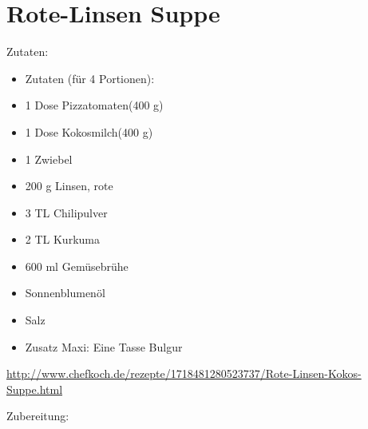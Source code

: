 \section{Rote-Linsen Suppe}
Zutaten:
\begin{itemize}
	\item Zutaten (für 4 Portionen):
	\item 1 Dose	Pizzatomaten(400 g)
	\item 1 Dose	Kokosmilch(400 g)
	\item 1 	Zwiebel
	\item 200 g	Linsen, rote
	\item 3 TL	Chilipulver
	\item 2 TL	Kurkuma
	\item 600 ml	Gemüsebrühe
	\item Sonnenblumenöl
	\item Salz
	\item Zusatz Maxi: Eine Tasse Bulgur
\end{itemize}

\url{http://www.chefkoch.de/rezepte/1718481280523737/Rote-Linsen-Kokos-Suppe.html}

\noindent Zubereitung:

\noindent
\mbox{}
\vfill
\begin{center}
\end{center}
\vfill
\mbox{ }
\newpage
